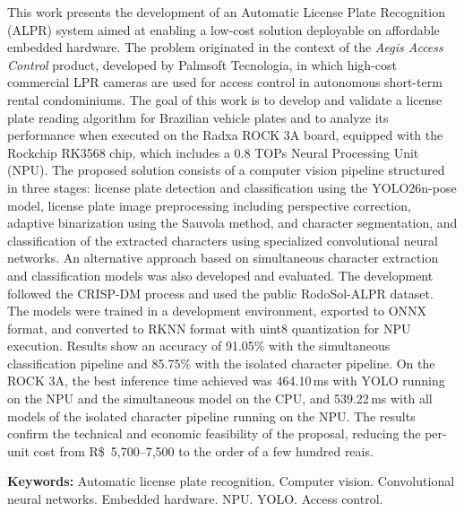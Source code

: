 \begin{resumo}[Abstract]
This work presents the development of an Automatic License Plate Recognition (ALPR) system aimed at enabling a low-cost solution deployable on affordable embedded hardware. The problem originated in the context of the \textit{Aegis Access Control} product, developed by Palmsoft Tecnologia, in which high-cost commercial LPR cameras are used for access control in autonomous short-term rental condominiums. The goal of this work is to develop and validate a license plate reading algorithm for Brazilian vehicle plates and to analyze its performance when executed on the Radxa ROCK 3A board, equipped with the Rockchip RK3568 chip, which includes a 0.8 TOPs Neural Processing Unit (NPU). The proposed solution consists of a computer vision pipeline structured in three stages: license plate detection and classification using the YOLO26n-pose model, license plate image preprocessing including perspective correction, adaptive binarization using the Sauvola method, and character segmentation, and classification of the extracted characters using specialized convolutional neural networks. An alternative approach based on simultaneous character extraction and classification models was also developed and evaluated. The development followed the CRISP-DM process and used the public RodoSol-ALPR dataset. The models were trained in a development environment, exported to ONNX format, and converted to RKNN format with uint8 quantization for NPU execution. Results show an accuracy of 91.05\% with the simultaneous classification pipeline and 85.75\% with the isolated character pipeline. On the ROCK 3A, the best inference time achieved was 464.10\,ms with YOLO running on the NPU and the simultaneous model on the CPU, and 539.22\,ms with all models of the isolated character pipeline running on the NPU. The results confirm the technical and economic feasibility of the proposal, reducing the per-unit cost from R\$~5,700--7,500 to the order of a few hundred reais.
 
\textbf{Keywords:} Automatic license plate recognition. Computer vision. Convolutional neural networks. Embedded hardware. NPU. YOLO. Access control.
 
\end{resumo}

% 
%
%  

